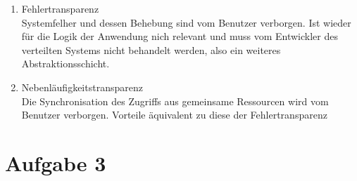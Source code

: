 \begin{enumerate}
\begin{enumerate}
\item Fehlertransparenz \\
Systemfelher und dessen Behebung sind vom Benutzer verborgen. Ist wieder für die Logik der Anwendung nich relevant und muss vom Entwickler des verteilten Systems nicht behandelt werden, also ein weiteres Abstraktionsschicht.

\item Nebenläufigkeitstransparenz \\
Die Synchronisation des Zugriffs aus gemeinsame Ressourcen wird vom Benutzer verborgen. Vorteile äquivalent zu diese der Fehlertransparenz 

\end{enumerate}

\end{enumerate}

\section*{Aufgabe 3}

